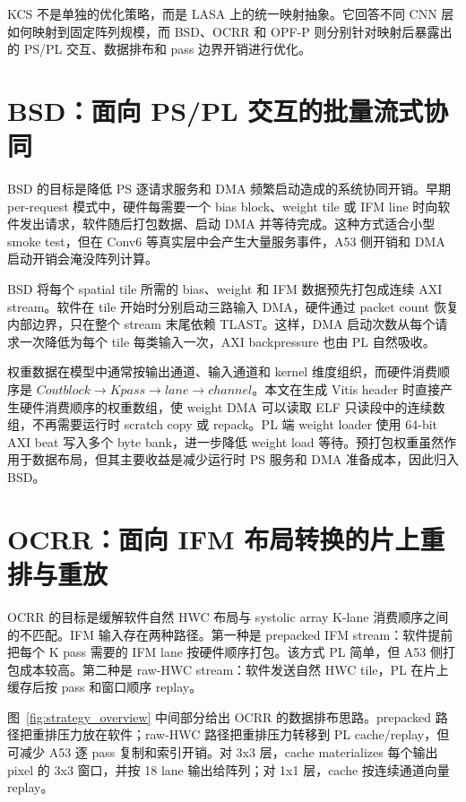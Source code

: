 KCS 不是单独的优化策略，而是 LASA 上的统一映射抽象。它回答不同 CNN 层如何映射到固定阵列规模，而 BSD、OCRR 和 OPF-P 则分别针对映射后暴露出的 PS/PL 交互、数据排布和 pass 边界开销进行优化。

\section{BSD：面向 PS/PL 交互的批量流式协同}

BSD 的目标是降低 PS 逐请求服务和 DMA 频繁启动造成的系统协同开销。早期 per-request 模式中，硬件每需要一个 bias block、weight tile 或 IFM line 时向软件发出请求，软件随后打包数据、启动 DMA 并等待完成。这种方式适合小型 smoke test，但在 Conv6 等真实层中会产生大量服务事件，A53 侧开销和 DMA 启动开销会淹没阵列计算。

BSD 将每个 spatial tile 所需的 bias、weight 和 IFM 数据预先打包成连续 AXI stream。软件在 tile 开始时分别启动三路输入 DMA，硬件通过 packet count 恢复内部边界，只在整个 stream 末尾依赖 TLAST。这样，DMA 启动次数从每个请求一次降低为每个 tile 每类输入一次，AXI backpressure 也由 PL 自然吸收。

权重数据在模型中通常按输出通道、输入通道和 kernel 维度组织，而硬件消费顺序是 $Cout block \rightarrow K pass \rightarrow lane \rightarrow channel$。本文在生成 Vitis header 时直接产生硬件消费顺序的权重数组，使 weight DMA 可以读取 ELF 只读段中的连续数组，不再需要运行时 scratch copy 或 repack。PL 端 weight loader 使用 64-bit AXI beat 写入多个 byte bank，进一步降低 weight load 等待。预打包权重虽然作用于数据布局，但其主要收益是减少运行时 PS 服务和 DMA 准备成本，因此归入 BSD。

\section{OCRR：面向 IFM 布局转换的片上重排与重放}

OCRR 的目标是缓解软件自然 HWC 布局与 systolic array K-lane 消费顺序之间的不匹配。IFM 输入存在两种路径。第一种是 prepacked IFM stream：软件提前把每个 K pass 需要的 IFM lane 按硬件顺序打包。该方式 PL 简单，但 A53 侧打包成本较高。第二种是 raw-HWC stream：软件发送自然 HWC tile，PL 在片上缓存后按 pass 和窗口顺序 replay。

图~\ref{fig:strategy_overview} 中间部分给出 OCRR 的数据排布思路。prepacked 路径把重排压力放在软件；raw-HWC 路径把重排压力转移到 PL cache/replay，但可减少 A53 逐 pass 复制和索引开销。对 3x3 层，cache materializes 每个输出 pixel 的 3x3 窗口，并按 18 lane 输出给阵列；对 1x1 层，cache 按连续通道向量 replay。

